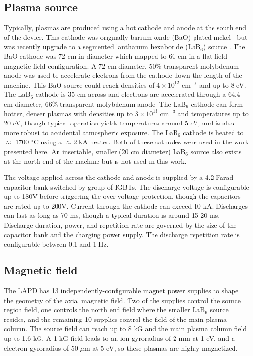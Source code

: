 \subsection{Plasma source}

Typically, plasmas are produced using a hot cathode and anode at the south end of the device. This cathode was originally barium oxide (BaO)-plated nickel \cite{gekelman_upgraded_2016}, but was recently upgrade to a segmented lanthanum hexaboride (LaB$_6$) source \cite{qian_design_2023}. The BaO cathode was $72$ cm in diameter which mapped to 60 cm in a flat field magnetic field configuration. A $72$ cm diameter, 50\% transparent molybdenum anode was used to accelerate electrons from the cathode down the length of the machine. This BaO source could reach densities of $4 \times 10^{12}$ cm$^{-3}$ and up to 8 eV. The LaB$_6$ cathode is 35 cm across and electrons are accelerated through a 64.4 cm diameter, 66\% transparent molybdenum anode. The LaB$_6$ cathode can form hotter, denser plasmas with densities up to $3 \times 10^{13}$ cm$^{-3}$ and temperatures up to 20 eV, though typical operation yields temperatures around 5 eV, and is also more robust to accidental atmospheric exposure. The LaB$_6$ cathode is heated to $\approx$ 1700 $^\circ$C using a $\approx$2 kA heater. Both of these cathodes were used in the work presented here. An insertable, smaller (20 cm diameter) LaB$_6$ source also exists at the north end of the machine but is not used in this work.

The voltage applied across the cathode and anode is supplied by a 4.2 Farad capacitor bank switched by group of IGBTs. The discharge voltage is configurable up to 180V before triggering the over-voltage protection, though the capacitors are rated up to 200V. Current through the cathode can exceed 10 kA. Discharges can last as long as 70 ms, though a typical duration is around 15-20 ms. Discharge duration, power, and repetition rate are governed by the size of the capacitor bank and the charging power supply. The discharge repetition rate is configurable between 0.1 and 1 Hz.

\subsection{Magnetic field}
The LAPD has 13 independently-configurable magnet power supplies to shape the geometry of the axial magnetic field. Two of the supplies control the source region field, one controls the north end field where the smaller LaB$_6$ source resides, and the remaining 10 supplies control the field of the main plasma column. The source field can reach up to 8 kG and the main plasma column field up to 1.6 kG. A 1 kG field leads to an ion gyroradius of 2 mm at 1 eV, and a electron gyroradius of 50 $\mu$m at 5 eV, so these plasmas are highly magnetized.

